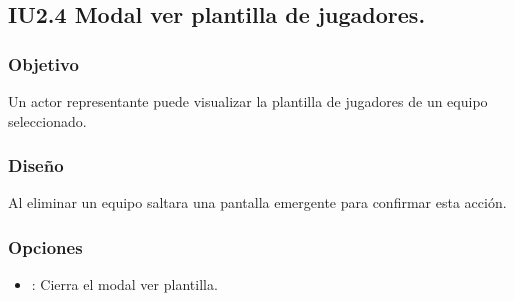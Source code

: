 
\subsection{IU2.4 Modal ver plantilla de jugadores.}

\subsubsection{Objetivo}
	Un actor representante puede visualizar la plantilla de jugadores de un equipo seleccionado.

\subsubsection{Diseño}
  Al eliminar un equipo saltara una pantalla emergente para confirmar esta acción.

\subsubsection{Opciones}
\begin{itemize}
  \item {}: Cierra el modal ver plantilla.
  
\end{itemize}